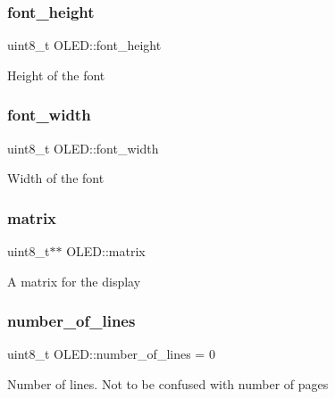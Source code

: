 \subsubsection{\texorpdfstring{font\+\_\+height}{font\_height}}
{\footnotesize\ttfamily uint8\+\_\+t O\+L\+E\+D\+::font\+\_\+height\hspace{0.3cm}{\ttfamily [protected]}}

Height of the font \hypertarget{class_o_l_e_d_a3c9ea103adf6c860a2534135e9a25ba8}{}\label{class_o_l_e_d_a3c9ea103adf6c860a2534135e9a25ba8} 
\subsubsection{\texorpdfstring{font\+\_\+width}{font\_width}}
{\footnotesize\ttfamily uint8\+\_\+t O\+L\+E\+D\+::font\+\_\+width\hspace{0.3cm}{\ttfamily [protected]}}

Width of the font \hypertarget{class_o_l_e_d_a9d32e21189940afba24deab0a2bc0126}{}\label{class_o_l_e_d_a9d32e21189940afba24deab0a2bc0126} 
\subsubsection{\texorpdfstring{matrix}{matrix}}
{\footnotesize\ttfamily uint8\+\_\+t$\ast$$\ast$ O\+L\+E\+D\+::matrix\hspace{0.3cm}{\ttfamily [protected]}}

A matrix for the display \hypertarget{class_o_l_e_d_a9ea1c55112deede1a61142af276a6bc9}{}\label{class_o_l_e_d_a9ea1c55112deede1a61142af276a6bc9} 
\subsubsection{\texorpdfstring{number\+\_\+of\+\_\+lines}{number\_of\_lines}}
{\footnotesize\ttfamily uint8\+\_\+t O\+L\+E\+D\+::number\+\_\+of\+\_\+lines = 0\hspace{0.3cm}{\ttfamily [protected]}}

Number of lines. Not to be confused with number of pages \hypertarget{class_o_l_e_d_aaac99b0eb4e9dfe92b8571488dc89288}{}\label{class_o_l_e_d_aaac99b0eb4e9dfe92b8571488dc89288} 
